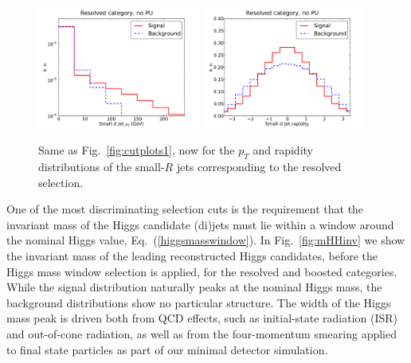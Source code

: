 \begin{figure}[t]
\begin{center}
 \includegraphics[width=0.48\textwidth]{plots/pt_smallRjets_res_noPU.pdf}
 \includegraphics[width=0.48\textwidth]{plots/eta_smallRjets_res_noPU.pdf}
 \caption{\small Same as Fig.~\ref{fig:cutplots1}, now for the
   $p_T$ and rapidity distributions of the small-$R$
   jets corresponding to the resolved selection.
}
\label{fig:cutplots23}
\end{center}
\end{figure}

One of the most discriminating selection cuts is the requirement
that the invariant mass of the Higgs candidate (di)jets must lie within a window
around the nominal Higgs value, Eq.~(\ref{higgsmasswindow}).
%
In Fig.~\ref{fig:mHHinv} we show the invariant mass
of the leading reconstructed Higgs candidates, before the Higgs mass window
selection
  is applied, for the resolved and boosted categories.
%
While the signal distribution naturally peaks at the
nominal Higgs mass, the background distributions
show no particular
structure.
%
The
width of the Higgs mass peak is driven both from QCD effects,
such as initial-state radiation (ISR)
and out-of-cone radiation, as well
as from the four-momentum smearing applied to final state particles
as part of our minimal detector simulation.
%

